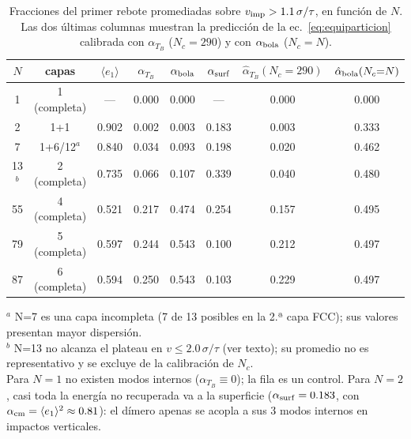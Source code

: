 \documentclass[aps,pre,twocolumn,reprint,superscriptaddress]{revtex4-2}
\begin{document}
\begin{table}[tp]
\centering
\caption{Fracciones del primer rebote promediadas sobre $v_{\rm imp}>1.1\,\sigma/\tau$,
en función de $N$. Las dos últimas columnas muestran la predicción de la
ec.~\eqref{eq:equiparticion} calibrada con $\alpha_{T_B}$ ($N_c=290$) y con
$\alpha_{\rm bola}$ ($N_c=N$).}
\label{tab:sweep_N}
\begin{tabular}{cccccccc}
\toprule
$N$ & capas & $\langle e_1\rangle$ & $\alpha_{T_B}$ & $\alpha_{\rm bola}$ &
$\alpha_{\rm surf}$ &
$\hat\alpha_{T_B}(N_c{=}290)$ & $\hat\alpha_{\rm bola}(N_c{=}N)$ \\
\midrule
 1 & 1 (completa) & — & 0.000 & 0.000 & —     & 0.000 & 0.000 \\
 2 & 1+1          & 0.902 & 0.002 & 0.003 & 0.183 & 0.003 & 0.333 \\
 7 & 1+6/12$^a$   & 0.840 & 0.034 & 0.093 & 0.198 & 0.020 & 0.462 \\
13$^b$ & 2 (completa) & 0.735 & 0.066 & 0.107 & 0.339 & 0.040 & 0.480 \\
55 & 4 (completa) & 0.521 & 0.217 & 0.474 & 0.254 & 0.157 & 0.495 \\
79 & 5 (completa) & 0.597 & 0.244 & 0.543 & 0.100 & 0.212 & 0.497 \\
87 & 6 (completa) & 0.594 & 0.250 & 0.543 & 0.103 & 0.229 & 0.497 \\
\bottomrule
\end{tabular}
\footnotesize $^a$ N=7 es una capa incompleta (7 de 13 posibles en la 2.ª capa FCC);
sus valores presentan mayor dispersión.\\
\footnotesize $^b$ N=13 no alcanza el plateau en $v\leq2.0\,\sigma/\tau$
(ver texto); su promedio no es representativo y se excluye de la
calibración de $N_c$.\\
\footnotesize Para $N=1$ no existen modos internos ($\alpha_{T_B}\equiv0$);
la fila es un control. Para $N=2$, casi toda la energía no recuperada va a
la superficie ($\alpha_{\rm surf}=0.183$, con
$\alpha_{\rm cm}=\langle e_1\rangle^2\approx0.81$): el dímero apenas se
acopla a sus 3 modos internos en impactos verticales.
\end{table}
\end{document}
